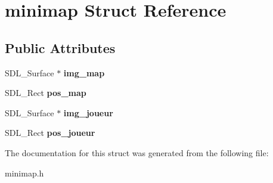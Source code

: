 \hypertarget{structminimap}{}\section{minimap Struct Reference}
\label{structminimap}
\subsection*{Public Attributes}
\begin{DoxyCompactItemize}
\item 
S\+D\+L\+\_\+\+Surface $\ast$ {\bfseries img\+\_\+map}\hypertarget{structminimap_ae041423ad2575028bdca8fe3a1346701}{}\label{structminimap_ae041423ad2575028bdca8fe3a1346701}

\item 
S\+D\+L\+\_\+\+Rect {\bfseries pos\+\_\+map}\hypertarget{structminimap_ad69aa9fc21c7012be6536d51f867b889}{}\label{structminimap_ad69aa9fc21c7012be6536d51f867b889}

\item 
S\+D\+L\+\_\+\+Surface $\ast$ {\bfseries img\+\_\+joueur}\hypertarget{structminimap_abf1a069fd8bf5e6c66fceee3673b5839}{}\label{structminimap_abf1a069fd8bf5e6c66fceee3673b5839}

\item 
S\+D\+L\+\_\+\+Rect {\bfseries pos\+\_\+joueur}\hypertarget{structminimap_a1cc8cf7ef787208bee661d0da4745600}{}\label{structminimap_a1cc8cf7ef787208bee661d0da4745600}

\end{DoxyCompactItemize}


The documentation for this struct was generated from the following file\+:\begin{DoxyCompactItemize}
\item 
minimap.\+h\end{DoxyCompactItemize}
